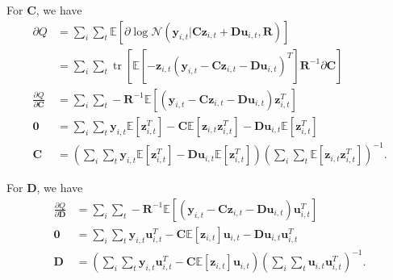 \documentclass[a4paper,11pt]{article}
\DeclareMathOperator*{\tr}{tr}
\begin{document}
For $\mathbf{C}$, we have
\begin{align*}
	\partial Q &= \sum\limits_i\sum\limits_t \mathbb{E}\left[
		\partial \log \mathcal{N}(
			\mathbf{y}_{i,t} | \mathbf{C}\mathbf{z}_{i,t} + \mathbf{D}\mathbf{u}_{i,t}, \mathbf{R}
		)
	\right] \\
	&= \sum\limits_i\sum\limits_t \tr\left[
		\mathbb{E}\left[
			- \mathbf{z}_{i,t} \left(
				\mathbf{y}_{i,t} - \mathbf{C}\mathbf{z}_{i,t} - \mathbf{D}\mathbf{u}_{i,t}
			\right)^T
		\right] \mathbf{R}^{-1} \partial\mathbf{C} 
	\right] \\
	\frac{ \partial Q }{ \partial\mathbf{C} }
	&= \sum\limits_i\sum\limits_t -\mathbf{R}^{-1} \mathbb{E}\left[
		\left(
			\mathbf{y}_{i,t} - \mathbf{C}\mathbf{z}_{i,t} - \mathbf{D}\mathbf{u}_{i,t}
		\right) \mathbf{z}_{i,t}^T
	\right] \\
	\mathbf{0} &= \sum\limits_i\sum\limits_t 
	\mathbf{y}_{i,t} \mathbb{E}\left[ \mathbf{z}_{i,t}^T \right]
	- \mathbf{C} \mathbb{E}\left[ \mathbf{z}_{i,t}\mathbf{z}_{i,t}^T \right]
	- \mathbf{D}\mathbf{u}_{i,t} \mathbb{E}\left[ \mathbf{z}_{i,t}^T \right] \\
	\mathbf{C} &= \left(
		\sum\limits_i\sum\limits_t 
		\mathbf{y}_{i,t} \mathbb{E}\left[ \mathbf{z}_{i,t}^T \right]
		- \mathbf{D}\mathbf{u}_{i,t} \mathbb{E}\left[ \mathbf{z}_{i,t}^T \right]
	\right)\left(
		\sum\limits_i\sum\limits_t 
		\mathbb{E}\left[ \mathbf{z}_{i,t}\mathbf{z}_{i,t}^T \right]
	\right)^{-1}.
\end{align*}

For $\mathbf{D}$, we have
\begin{align*}
	\frac{ \partial Q }{ \partial \mathbf{D} }
	&= \sum\limits_i\sum\limits_t -\mathbf{R}^{-1} \mathbb{E}\left[
	    \left(
	  	    \mathbf{y}_{i,t} - \mathbf{C}\mathbf{z}_{i,t} - \mathbf{D}\mathbf{u}_{i,t}
		\right) \mathbf{u}_{i,t}^T
	\right] \\
	\mathbf{0} &= \sum\limits_i\sum\limits_t 
	\mathbf{y}_{i,t} \mathbf{u}_{i,t}^T
	- \mathbf{C} \mathbb{E}\left[ \mathbf{z}_{i,t} \right] \mathbf{u}_{i,t}
	- \mathbf{D}\mathbf{u}_{i,t}\mathbf{u}_{i,t}^T \\
	\mathbf{D} &= \left(
	    \sum\limits_i\sum\limits_t 
	    \mathbf{y}_{i,t} \mathbf{u}_{i,t}^T
	    - \mathbf{C} \mathbb{E}\left[\mathbf{z}_{i,t}\right] \mathbf{u}_{i,t}
	\right)\left(
	    \sum\limits_i\sum\limits_t 
	    \mathbf{u}_{i,t}\mathbf{u}_{i,t}^T
	\right)^{-1}.
\end{align*}
\end{document}
